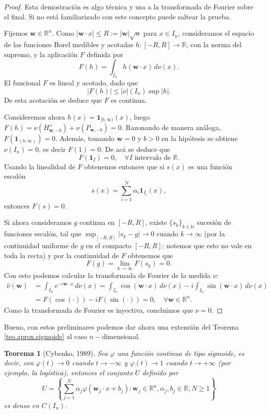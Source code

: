 \documentclass[12pt, a4paper]{amsbook}
\newcommand{\R}{{\mathbb R}}
\newcommand{\N}{{\mathbb N}}
\newcommand{\ww}{{\mathbf w}}
\newcommand{\I}{{\mathbf 1}}
\newtheorem{teo}{Teorema}[section]
\theoremstyle{remark}
\theoremstyle{definition}
\numberwithin{section}{chapter}
\numberwithin{subsection}{section}
\numberwithin{equation}{section}
\numberwithin{figure}{chapter}
\begin{document}
\begin{proof}
Esta demostración es algo técnica y usa a la transformada de Fourier sobre el final. Si no está familiarizado con este concepto puede saltear la prueba.

Fijemos $\ww\in\R^n$. Como $|\ww\cdot x|\le R:=|\ww|\sqrt n$ para $x\in I_n$, consideramos el espacio de las funciones Borel medibles y acotadas $h\colon[-R,R]\to\R$, con la norma del supremo, y la aplicación $F$ definida por
$$
F(h) = \int_{I_n} h(\ww\cdot x)\, d\nu(x).
$$
El funcional $F$ es lineal y acotado, dado que
$$
|F(h)| \le |\nu|(I_n) \sup|h|.
$$
De esta acotación se deduce que $F$ es continua.

Consideremos ahora $h(x) = \I_{[b, \infty)}(x)$, luego $F(h) = \nu(H^+_{\ww,-b}) + \nu(P_{\ww,-b}) = 0$. Razonando de manera análoga, $F(\I_{(b,\infty)}) = 0$. Además, tomando $\ww=0$ y $b>0$ en la hipótesis se obtiene $\nu(I_n)=0$, es decir $F(1)=0$. De acá se deduce que
$$
F(\I_I)=0,\quad \forall I \text{ intervalo de } \R.
$$
Usando la linealidad de $F$ obtenemos entonces que si $s(x)$ es una función escalón
$$
s(x) = \sum_{i=1}^N \alpha_i \I_{I_i}(x),
$$
entonces $F(s)=0$.

Si ahora consideramos $g$ continua en $[-R,R]$, existe $\{s_k\}_{k\in\N}$ sucesión de funciones escalón, tal que $\sup_{[-R,R]}|s_k-g|\to 0$ cuando $k\to \infty$ (por la continuidad uniforme de $g$ en el compacto $[-R,R]$; notemos que esto no vale en toda la recta) y por la continuidad de $F$ obtenemos que
$$
F(g) = \lim_{k\to\infty} F(s_k) = 0.
$$
Con esto podemos calcular la transformada de Fourier de la medida $\nu$:
\begin{align*}
\hat \nu (\ww) &= \int_{I_n} e^{-i\ww\cdot x}\, d\nu(x) = \int_{I_n} \cos(\ww\cdot x)\, d\nu(x) - i\int_{I_n} \sin(\ww\cdot x)\, d\nu(x) \\
&= F(\cos(\cdot)) - iF(\sin(\cdot)) = 0,\quad \forall \ww\in \R^n.
\end{align*}
Como la transformada de Fourier es inyectiva, concluimos que $\nu=0$.
\end{proof}

Bueno, con estos preliminares podemos dar ahora una extensión del Teorema \ref{teo.aprox.sigmoide} al caso $n-$dimensional.
\begin{teo}[Cybenko, 1989]\label{teo9.3.6}
Sea $\varphi$ una función continua de tipo sigmoide, es decir, con $\varphi(t)\to0$ cuando $t\to-\infty$ y $\varphi(t)\to1$ cuando $t\to+\infty$ (por ejemplo, la logística), entonces el conjunto $U$ definido por
$$
U = \left\{ \sum_{j=1}^N \alpha_j \varphi(\ww_j\cdot x + b_j)\colon \ww_j\in \R^n, \alpha_j, b_j\in \R, N\ge 1\right\}
$$
es denso en $C(I_n)$.
\end{teo}
\end{document}

